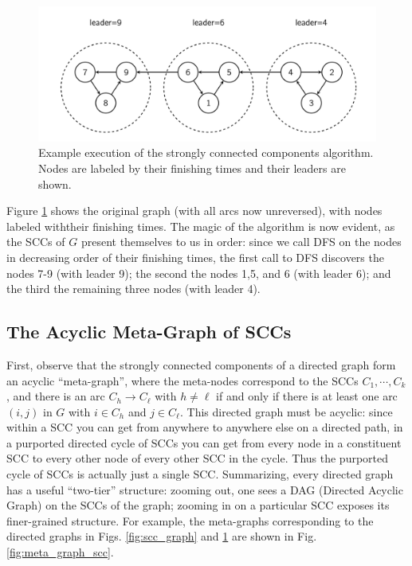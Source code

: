 \documentclass [12pt]{article}
\theoremstyle{definition}
\begin{document}
\begin{figure}[h!]
\includegraphics[scale=0.8]{scc_alg.png}
\caption{Example execution of the strongly connected components algorithm. Nodes are labeled by their finishing times and their leaders are shown.}
\label{fig:scc_alg}
\end{figure}

Figure \ref{fig:scc_alg} shows the original graph (with all arcs now unreversed), with nodes labeled withtheir finishing times. The magic of the algorithm is now evident, as the SCCs of $G$ present themselves to us in order: since we call DFS on the nodes in decreasing order of their finishing times, the first call to DFS discovers the nodes 7-9 (with leader 9); the second the nodes 1,5, and 6 (with leader 6); and the third the remaining three nodes (with leader 4).

\subsection{The Acyclic Meta-Graph of SCCs} 
First, observe that the strongly connected components of a directed graph form an acyclic ``meta-graph'', where the meta-nodes correspond to the SCCs $C_1, \cdots , C_k$ , and there is an arc $C_h \to C_{\ell}$ with $h \neq \ell$ if and only if there is at least one arc $(i, j)$ in $G$ with $i \in C_h$ and $j \in C_{\ell}$. This directed graph must be acyclic: since within a SCC you can get from anywhere to anywhere else on a directed path, in a purported directed cycle of SCCs you can get from every node in a constituent SCC to every other node of every other SCC in the cycle. Thus the purported cycle of SCCs is actually just a single SCC. Summarizing, every directed graph has a useful ``two-tier'' structure: zooming out, one sees a DAG (Directed Acyclic Graph) on the SCCs of the graph; zooming in on a particular SCC exposes its finer-grained structure. For example, the meta-graphs corresponding to the directed graphs in Figs. \ref{fig:scc_graph} and \ref{fig:scc_alg} are shown in Fig. \ref{fig:meta_graph_scc}.
\end{document}

